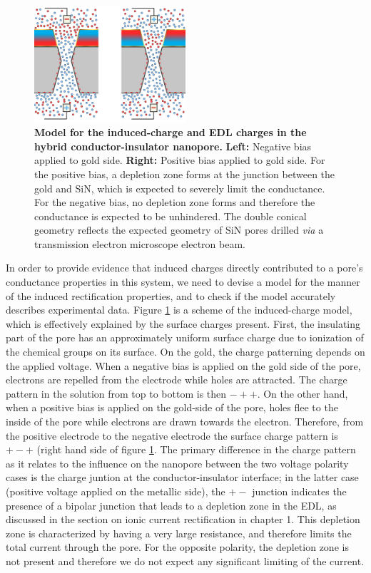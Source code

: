 		\begin{figure}
			\includegraphics[width=0.5\textwidth]{SiN-Gold_Model.png}
			\caption{\textbf{Model for the induced-charge and EDL charges in the hybrid conductor-insulator nanopore.} \textbf{Left:} Negative bias applied to gold side. \textbf{Right:} Positive bias applied to gold side. For the positive bias, a depletion zone forms at the junction between the gold and SiN, which is expected to severely limit the conductance. For the negative bias, no depletion zone forms and therefore the conductance is expected to be unhindered. The double conical geometry reflects the expected geometry of SiN pores drilled \textit{via} a transmission electron microscope electron beam.}
			\label{fig:SiNGoldModel}
		\end{figure}

		
		In order to provide evidence that induced charges directly contributed to a pore's conductance properties in this system, we need to devise a model for the manner of the induced rectification properties, and to check if the model accurately describes experimental data. Figure \ref{fig:SiNGoldModel} is a scheme of the induced-charge model, which is effectively explained by the surface charges present. First, the insulating part of the pore has an approximately uniform surface charge due to ionization of the chemical groups on its surface. On the gold, the charge patterning depends on the applied voltage. When a negative bias is applied on the gold side of the pore, electrons are repelled from the electrode while holes are attracted. The charge pattern in the solution from top to bottom is then $-++$. On the other hand, when a positive bias is applied on the gold-side of the pore, holes flee to the inside of the pore while electrons are drawn towards the electron. Therefore, from the positive electrode to the negative electrode the surface charge pattern is $+-+$ (right hand side of figure \ref{fig:SiNGoldModel}. The primary difference in the charge pattern as it relates to the influence on the nanopore between the two voltage polarity cases is the charge juntion at the conductor-insulator interface; in the latter case (positive voltage applied on the metallic side), the $+-$ junction indicates the presence of a bipolar junction that leads to a depletion zone in the EDL, as discussed in the section on ionic current rectification in chapter 1. This depletion zone is characterized by having a very large resistance, and therefore limits the total current through the pore. For the opposite polarity, the depletion zone is not present and therefore we do not expect any significant limiting of the current.
		
